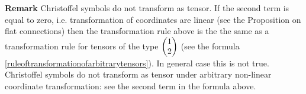 \documentclass[12pt]{article}
\theoremstyle{theorem}
\numberwithin{equation}{section}
\begin{document}
{\bf Remark}  Christoffel symbols do not transform as tensor.
If the second term is equal to zero, i.e. transformation of coordinates are linear
(see the Proposition on flat connections)  then the transformation rule above is the the same as a
transformation rule for tensors of the type $\begin{pmatrix} 1\cr 2\cr\end{pmatrix}$
(see the formula \eqref{ruleoftransformationofarbitrarytensors}).
 In general case this is not true. Christoffel symbols do not transform as tensor
 under arbitrary non-linear coordinate transformation: see the second term in the formula above.


 
\end{document}
